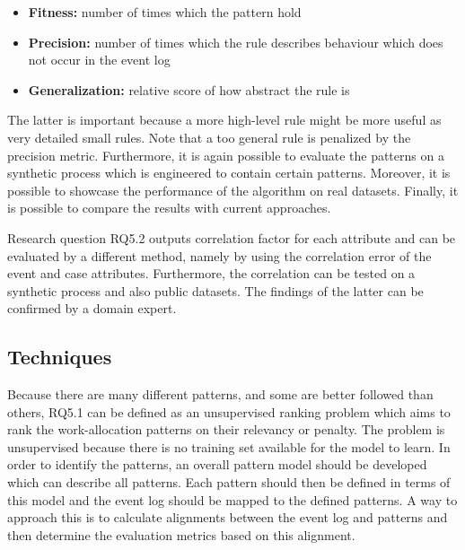 \begin{itemize}
\item \textbf{Fitness:} number of times which the pattern hold
\item \textbf{Precision:} number of times which the rule describes behaviour which does not occur in the event log
\item \textbf{Generalization:} relative score of how abstract the rule is 
\end{itemize}

The latter is important because a more high-level rule might be more useful as very detailed small rules. Note that a too general rule is penalized by the precision metric. Furthermore, it is again possible to evaluate the patterns on a synthetic process which is engineered to contain certain patterns. Moreover, it is possible to showcase the performance of the algorithm on real datasets. Finally, it is possible to compare the results with current approaches. 

Research question RQ5.2 outputs correlation factor for each attribute and can be evaluated by a different method, namely by using the correlation error of the event and case attributes. Furthermore, the correlation can be tested on a synthetic process and also public datasets. The findings of the latter can be confirmed by a domain expert. 


\subsection{Techniques}
Because there are many different patterns, and some are better followed than others, RQ5.1 can be defined as an unsupervised ranking problem which aims to rank the work-allocation patterns on their relevancy or penalty. The problem is unsupervised because there is no training set available for the model to learn. In order to identify the patterns, an overall pattern model should be developed which can describe all patterns. Each pattern should then be defined in terms of this model and the event log should be mapped to the defined patterns. A way to approach this is to calculate alignments between the event log and patterns and then determine the evaluation metrics based on this alignment.  


